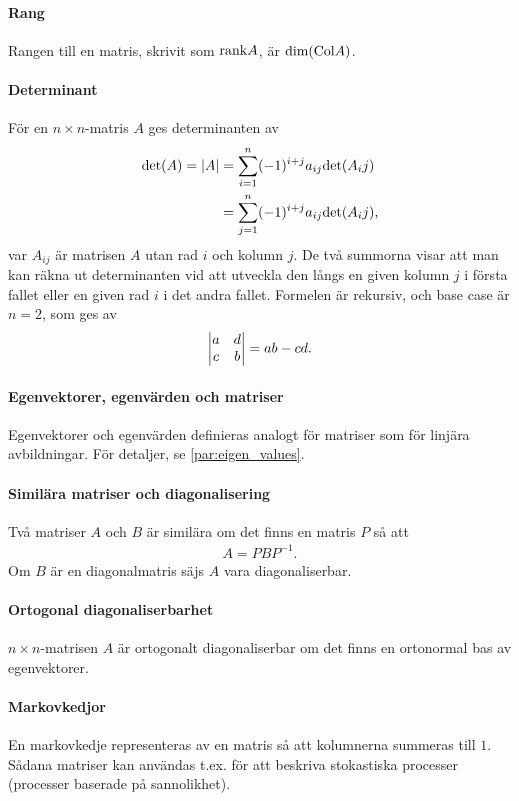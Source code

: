 \paragraph{Rang}
Rangen till en matris, skrivit som $\text{rank} A$, är $\text{dim}(\text{Col} A)$.

\paragraph{Determinant}
För en $n\times n$-matris $A$ ges determinanten av
\begin{align*}
	\text{det}(A) = \abs{A} &= \sum\limits_{i = 1}^{n}(-1)^{i + j}a_{ij}\text{det}(A_ij) \\
	&= \sum\limits_{j = 1}^{n}(-1)^{i + j}a_{ij}\text{det}(A_ij),
\end{align*}
var $A_{ij}$ är matrisen $A$ utan rad $i$ och kolumn $j$. De två summorna visar att man kan räkna ut determinanten vid att utveckla den långs en given kolumn $j$ i första fallet eller en given rad $i$ i det andra fallet. Formelen är rekursiv, och base case är $n=2$, som ges av
\begin{align*}
	\mdet{a & d \\ c & b} = ab - cd.
\end{align*}

\paragraph{Egenvektorer, egenvärden och matriser}
Egenvektorer och egenvärden definieras analogt för matriser som för linjära avbildningar. För detaljer, se \ref{par:eigen_values}.

\paragraph{Similära matriser och diagonalisering}
Två matriser $A$ och $B$ är similära om det finns en matris $P$ så att
\begin{align*}
	A = PBP^{-1}.
\end{align*}
Om $B$ är en diagonalmatris säjs $A$ vara diagonaliserbar.

\paragraph{Ortogonal diagonaliserbarhet}
$n\times n$-matrisen $A$ är ortogonalt diagonaliserbar om det finns en ortonormal bas av egenvektorer.

\paragraph{Markovkedjor}
En markovkedje representeras av en matris så att kolumnerna summeras till $1$. Sådana matriser kan användas t.ex. för att beskriva stokastiska processer (processer baserade på sannolikhet).

